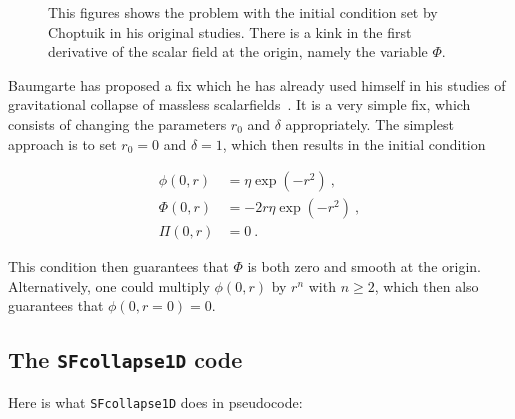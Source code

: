 \documentclass[a4paper,11pt]{article}
\renewcommand{\d}{\delta}
\newcommand{\lrpar}[1]{\left( #1 \right)}
\newcommand{\n}{\noindent}
\newcommand{\eq}[1]{
  \begin{equation}
    #1
  \end{equation}
}
\newcommand{\spl}[1]{
  \begin{split}
    #1
  \end{split}
}
\begin{document}
\begin{figure}[H]
  \centering
  
  \caption[Problem with the initial condition at the origin.]{This figures shows the problem with the initial condition set by Choptuik in his original studies. There is a kink in the first derivative of the scalar field at the origin, namely the variable $\Phi$.}
  \label{fig:origin_problem}
\end{figure}

Baumgarte has proposed a fix which he has already used himself in his studies of gravitational collapse of massless scalarfields~\cite{Baumgarte_2018}. It is a very simple fix, which consists of changing the parameters $r_{0}$ and $\delta$ appropriately. The simplest approach is to set $r_{0}=0$ and $\d=1$, which then results in the initial condition

\eq{
  \spl{
    \phi(0,r) &= \eta\exp\lrpar{-r^{2}}\ ,\\
    \Phi(0,r) &= -2r\eta\exp\lrpar{-r^{2}}\ ,\\
    \Pi(0,r) &= 0\ .
  }
  \label{eq:initial_condition_new}
}

\n This condition then guarantees that $\Phi$ is both zero and smooth at the origin. Alternatively, one could multiply $\phi(0,r)$ by $r^{n}$ with $n\geq2$, which then also guarantees that $\phi(0,r=0)=0$.

\subsection{The {\tt SFcollapse1D} code}

Here is what {\tt SFcollapse1D} does in pseudocode:
\end{document}
